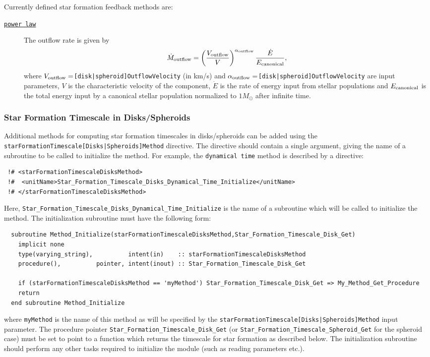Currently defined star formation feedback methods are:
\begin{description}
 \item [\hyperlink{star_formation.feedback.spheroids.power_law.F90:star_formation_feedback_spheroids_power_law:star_formation_feedback_spheroid_outflow_rate_power_law}{{\tt power law}}] The outflow rate is given by
\begin{equation}
 \dot{M}_{\rm outflow} = \left({V_{\rm outflow} \over V}\right)^{\alpha_{\rm outflow}} {\dot{E} \over E_{\rm canonical}},
\end{equation}
where $V_{\rm outflow}=${\tt [disk|spheroid]OutflowVelocity} (in km/s) and $\alpha_{\rm outflow}=${\tt [disk|spheroid]OutflowVelocity} are input parameters, $V$ is the characteristic velocity of the component, $\dot{E}$ is the rate of energy input from stellar populations and $E_{\rm canonical}$ is the total energy input by a canonical stellar population normalized to $1 M_\odot$ after infinite time.
\end{description}

\subsubsection{Star Formation Timescale in Disks/Spheroids}

Additional methods for computing star formation timescales in disks/spheroids can be added using the {\tt starFormationTimescale[Disks|Spheroids]Method} directive. The directive should contain a single argument, giving the name of a subroutine to be called to initialize the method. For example, the {\tt dynamical time} method is described by a directive:
\begin{verbatim}
 !# <starFormationTimescaleDisksMethod>
 !#  <unitName>Star_Formation_Timescale_Disks_Dynamical_Time_Initialize</unitName>
 !# </starFormationTimescaleDisksMethod>
\end{verbatim}
Here, {\tt Star\_Formation\_Timescale\_Disks\_Dynamical\_Time\_Initialize} is the name of a subroutine which will be called to initialize the method. The initialization subroutine must have the following form:
\begin{verbatim}
  subroutine Method_Initialize(starFormationTimescaleDisksMethod,Star_Formation_Timescale_Disk_Get)
    implicit none
    type(varying_string),          intent(in)    :: starFormationTimescaleDisksMethod
    procedure(),          pointer, intent(inout) :: Star_Formation_Timescale_Disk_Get
    
    if (starFormationTimescaleDisksMethod == 'myMethod') Star_Formation_Timescale_Disk_Get => My_Method_Get_Procedure
    return
  end subroutine Method_Initialize
\end{verbatim}
where {\tt myMethod} is the name of this method as will be specified by the {\tt starFormationTimescale[Disks|Spheroids]Method} input parameter. The procedure pointer {\tt Star\_Formation\_Timescale\_Disk\_Get} (or {\tt Star\_Formation\_Timescale\_Spheroid\_Get} for the spheroid case) must be set to point to a function which returns the timescale for star formation as described below. The initialization subroutine should perform any other tasks required to initialize the module (such as reading parameters etc.).

